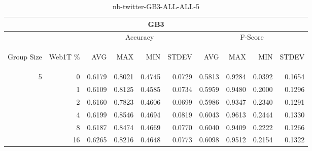 \begin{center}
\begin{table}[htbp]
\begin{tabular}{ | r | r | r | r | r | r | r | r | r | r |}
\hline
\multicolumn{10}{|c|}{GB3}\\
\hline
 & & \multicolumn{4}{|c|}{Accuracy} & \multicolumn{4}{|c|}{F-Score}\\ \cline{3-10}
\begin{sideways}Group Size\end{sideways} & \begin{sideways}Web1T \%\end{sideways} & \begin{sideways}AVG\end{sideways} & \begin{sideways}MAX\end{sideways} & \begin{sideways}MIN\end{sideways} & \begin{sideways}STDEV\end{sideways} & \begin{sideways}AVG\end{sideways} & \begin{sideways}MAX\end{sideways} & \begin{sideways}MIN\end{sideways} & \begin{sideways}STDEV\end{sideways}\\
\hline
\multirow{5}{*}{5}
 & 0 & 0.6179 & 0.8021 & 0.4745 & 0.0729 & 0.5813 & 0.9284 & 0.0392 & 0.1654\\ \cline{2-10}
 & 1 & 0.6109 & 0.8125 & 0.4585 & 0.0734 & 0.5959 & 0.9480 & 0.2000 & 0.1296\\ \cline{2-10}
 & 2 & 0.6160 & 0.7823 & 0.4606 & 0.0699 & 0.5986 & 0.9347 & 0.2340 & 0.1291\\ \cline{2-10}
 & 4 & 0.6199 & 0.8546 & 0.4694 & 0.0819 & 0.6043 & 0.9613 & 0.2444 & 0.1330\\ \cline{2-10}
 & 8 & 0.6187 & 0.8474 & 0.4669 & 0.0770 & 0.6040 & 0.9409 & 0.2222 & 0.1266\\ \cline{2-10}
 & 16 & 0.6265 & 0.8216 & 0.4648 & 0.0773 & 0.6098 & 0.9512 & 0.2154 & 0.1322\\ \cline{2-10}
\hline
\end{tabular}
\caption{nb-twitter-GB3-ALL-ALL-5}
\label{table:nb-twitter-GB3-ALL-ALL-5}
\end{table}
\end{center}

